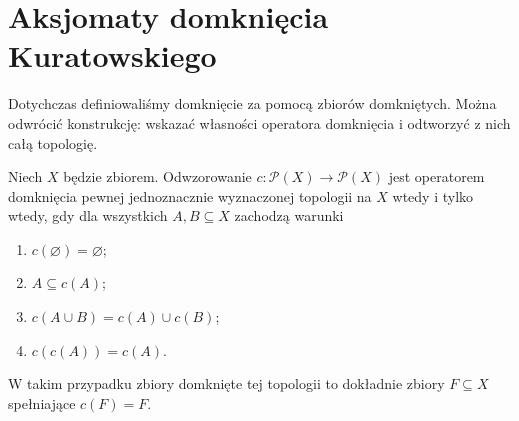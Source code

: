 \section{Aksjomaty domknięcia Kuratowskiego}
\label{sec:topog-kuratowski}

Dotychczas definiowaliśmy domknięcie za pomocą zbiorów domkniętych.
Można odwrócić konstrukcję: wskazać własności operatora
domknięcia i odtworzyć z nich całą topologię.

\begin{twierdzenie}
\label{thm:topog-kuratowski}
Niech $X$ będzie zbiorem. Odwzorowanie
$c\colon\mathcal P(X)\to\mathcal P(X)$ jest operatorem
domknięcia pewnej jednoznacznie wyznaczonej topologii
na $X$ wtedy i tylko wtedy, gdy dla wszystkich $A,B\subseteq X$
zachodzą warunki
\begin{enumerate}[label=(K\arabic*)]
\item $c(\varnothing)=\varnothing$;
\item $A\subseteq c(A)$;
\item $c(A\cup B)=c(A)\cup c(B)$;
\item $c(c(A))=c(A)$.
\end{enumerate}
W takim przypadku zbiory domknięte tej topologii
to dokładnie zbiory $F\subseteq X$ spełniające $c(F)=F$.
\end{twierdzenie}
